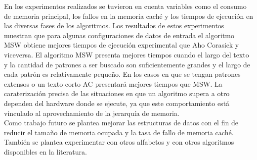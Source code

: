 En los experimentos realizados se tuvieron en cuenta variables como el consumo de memoria principal, los fallos en la memoria caché y los tiempos de ejecución en las diversas fases de los algoritmos. Los resultados de estos experimentos muestran que para algunas configuraciones de datos de entrada el algoritmo MSW obtiene mejores tiempos de ejecución experimental que Aho Corasick y viceversa. El algoritmo MSW presenta mejores tiempos cuando el largo del texto y la cantidad de patrones a ser buscado son suficientemente grandes y el largo de cada patrón es relativamente pequeño. En los casos en que se tengan patrones  extensos o un texto corto AC presentará mejores tiempos que MSW. La caraterización precisa de las situaciones en que un algoritmo supera a otro dependen del hardware donde se ejecute, ya que este comportamiento está vinculado al aprovechamiento de la jerarquía de memoria.\\
Como trabajo futuro se plantea mejorar las estructuras de datos con el fin de reducir el tamaño de memoria ocupada y la tasa de fallo de memoria caché. También se plantea experimentar con otros alfabetos y con otros algoritmos disponibles en la literatura.